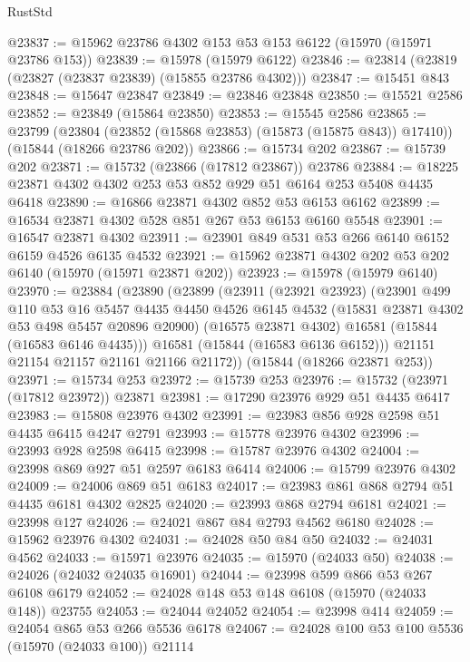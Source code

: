 \begin{lexlean}{RustStd}
\begin{coremodule}
@23837 := @15962 @23786 @4302 @153 @53 @153 @6122 (@15970 (@15971 @23786 @153))
@23839 := @15978 (@15979 @6122)
@23846 := @23814 (@23819 (@23827 (@23837 @23839) (@15855 @23786 @4302)))
@23847 := @15451 @843
@23848 := @15647 @23847
@23849 := @23846 @23848
@23850 := @15521 @2586
@23852 := @23849 (@15864 @23850)
@23853 := @15545 @2586
@23865 := @23799
    (@23804 (@23852 (@15868 @23853) (@15873 (@15875 @843)) @17410))
    (@15844 (@18266 @23786 @202))
@23866 := @15734 @202
@23867 := @15739 @202
@23871 := @15732 (@23866 (@17812 @23867)) @23786
@23884 := @18225 @23871 @4302 @4302 @253 @53 @852 @929 @51 @6164 @253 @5408 @4435 @6418
@23890 := @16866 @23871 @4302 @852 @53 @6153 @6162
@23899 := @16534 @23871 @4302 @528 @851 @267 @53 @6153 @6160 @5548
@23901 := @16547 @23871 @4302
@23911 := @23901 @849 @531 @53 @266 @6140 @6152 @6159 @4526 @6135 @4532
@23921 := @15962 @23871 @4302 @202 @53 @202 @6140 (@15970 (@15971 @23871 @202))
@23923 := @15978 (@15979 @6140)
@23970 := @23884
    (@23890
      (@23899
        (@23911
          (@23921 @23923)
          (@23901
            @499
            @110
            @53
            @16
            @5457
            @4435
            @4450
            @4526
            @6145
            @4532
            (@15831 @23871 @4302 @53 @498 @5457 @20896 @20900)
            (@16575 @23871 @4302)
            @16581
            (@15844 (@16583 @6146 @4435)))
          @16581
          (@15844 (@16583 @6136 @6152)))
        @21151
        @21154
        @21157
        @21161
        @21166
        @21172))
    (@15844 (@18266 @23871 @253))
@23971 := @15734 @253
@23972 := @15739 @253
@23976 := @15732 (@23971 (@17812 @23972)) @23871
@23981 := @17290 @23976 @929 @51 @4435 @6417
@23983 := @15808 @23976 @4302
@23991 := @23983 @856 @928 @2598 @51 @4435 @6415 @4247 @2791
@23993 := @15778 @23976 @4302
@23996 := @23993 @928 @2598 @6415
@23998 := @15787 @23976 @4302
@24004 := @23998 @869 @927 @51 @2597 @6183 @6414
@24006 := @15799 @23976 @4302
@24009 := @24006 @869 @51 @6183
@24017 := @23983 @861 @868 @2794 @51 @4435 @6181 @4302 @2825
@24020 := @23993 @868 @2794 @6181
@24021 := @23998 @127
@24026 := @24021 @867 @84 @2793 @4562 @6180
@24028 := @15962 @23976 @4302
@24031 := @24028 @50 @84 @50
@24032 := @24031 @4562
@24033 := @15971 @23976
@24035 := @15970 (@24033 @50)
@24038 := @24026 (@24032 @24035 @16901)
@24044 := @23998 @599 @866 @53 @267 @6108 @6179
@24052 := @24028 @148 @53 @148 @6108 (@15970 (@24033 @148)) @23755
@24053 := @24044 @24052
@24054 := @23998 @414
@24059 := @24054 @865 @53 @266 @5536 @6178
@24067 := @24028 @100 @53 @100 @5536 (@15970 (@24033 @100)) @21114

\end{coremodule}
\end{lexlean}
